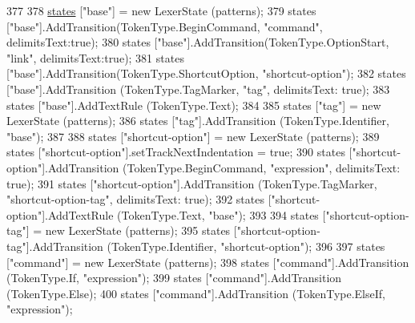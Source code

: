 \begin{DoxyCode}
{377 
378             \hyperlink{a00117_a2c65c0ba90f973e459583badefef216a}{states} [\textcolor{stringliteral}{"base"}] = \textcolor{keyword}{new} LexerState (patterns);
379             states [\textcolor{stringliteral}{"base"}].AddTransition(TokenType.BeginCommand, \textcolor{stringliteral}{"command"}, delimitsText:\textcolor{keyword}{true});
380             states [\textcolor{stringliteral}{"base"}].AddTransition(TokenType.OptionStart, \textcolor{stringliteral}{"link"}, delimitsText:\textcolor{keyword}{true});
381             states [\textcolor{stringliteral}{"base"}].AddTransition(TokenType.ShortcutOption, \textcolor{stringliteral}{"shortcut-option"});
382             states [\textcolor{stringliteral}{"base"}].AddTransition (TokenType.TagMarker, \textcolor{stringliteral}{"tag"}, delimitsText: \textcolor{keyword}{true});
383             states [\textcolor{stringliteral}{"base"}].AddTextRule (TokenType.Text);
384 
385             states [\textcolor{stringliteral}{"tag"}] = \textcolor{keyword}{new} LexerState (patterns);
386             states [\textcolor{stringliteral}{"tag"}].AddTransition (TokenType.Identifier, \textcolor{stringliteral}{"base"});
387 
388             states [\textcolor{stringliteral}{"shortcut-option"}] = \textcolor{keyword}{new} LexerState (patterns);
389             states [\textcolor{stringliteral}{"shortcut-option"}].setTrackNextIndentation = \textcolor{keyword}{true};
390             states [\textcolor{stringliteral}{"shortcut-option"}].AddTransition (TokenType.BeginCommand, \textcolor{stringliteral}{"expression"}, delimitsText: \textcolor{keyword}{
      true});
391             states [\textcolor{stringliteral}{"shortcut-option"}].AddTransition (TokenType.TagMarker, \textcolor{stringliteral}{"shortcut-option-tag"}, 
      delimitsText: \textcolor{keyword}{true});
392             states [\textcolor{stringliteral}{"shortcut-option"}].AddTextRule (TokenType.Text, \textcolor{stringliteral}{"base"});
393 
394             states [\textcolor{stringliteral}{"shortcut-option-tag"}] = \textcolor{keyword}{new} LexerState (patterns);
395             states [\textcolor{stringliteral}{"shortcut-option-tag"}].AddTransition (TokenType.Identifier, \textcolor{stringliteral}{"shortcut-option"});
396 
397             states [\textcolor{stringliteral}{"command"}] = \textcolor{keyword}{new} LexerState (patterns);
398             states [\textcolor{stringliteral}{"command"}].AddTransition (TokenType.If, \textcolor{stringliteral}{"expression"});
399             states [\textcolor{stringliteral}{"command"}].AddTransition (TokenType.Else);
400             states [\textcolor{stringliteral}{"command"}].AddTransition (TokenType.ElseIf, \textcolor{stringliteral}{"expression"});
}
\end{DoxyCode}
